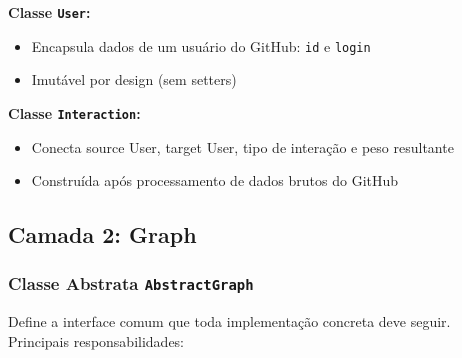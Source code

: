 \documentclass[12pt,a4paper]{article}
\begin{document}
\textbf{Classe \texttt{User}:}
\begin{itemize}
  \item Encapsula dados de um usuário do GitHub: \texttt{id} e \texttt{login}
  \item Imutável por design (sem setters)
\end{itemize}

\textbf{Classe \texttt{Interaction}:}
\begin{itemize}
  \item Conecta source User, target User, tipo de interação e peso resultante
  \item Construída após processamento de dados brutos do GitHub
\end{itemize}

\subsection{Camada 2: Graph}

\subsubsection{Classe Abstrata \texttt{AbstractGraph}}

Define a interface comum que toda implementação concreta deve seguir. Principais responsabilidades:
\end{document}
